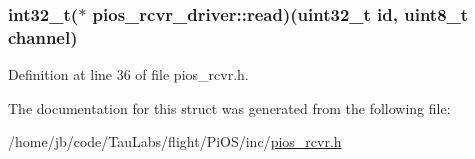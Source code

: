 \hypertarget{structpios__rcvr__driver_aece490b76542b52a499fe333f933372e}{
\subsubsection[{read}]{\setlength{\rightskip}{0pt plus 5cm}int32\-\_\-t($\ast$ {\bf pios\-\_\-rcvr\-\_\-driver\-::read})(uint32\-\_\-t {\bf id}, uint8\-\_\-t channel)}}\label{structpios__rcvr__driver_aece490b76542b52a499fe333f933372e}


\-Definition at line 36 of file pios\-\_\-rcvr.\-h.



\-The documentation for this struct was generated from the following file\-:\begin{DoxyCompactItemize}
\item 
/home/jb/code/\-Tau\-Labs/flight/\-Pi\-O\-S/inc/\hyperlink{pios__rcvr_8h}{pios\-\_\-rcvr.\-h}\end{DoxyCompactItemize}
